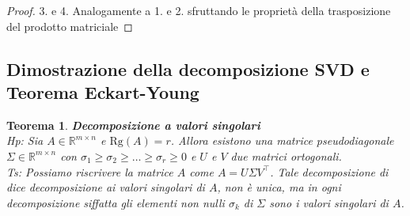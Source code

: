 \documentclass[11pt]{article}
\newtheorem{theorem}{Teorema}
\newcommand{\R}{\mathbb{R}} %
\begin{document}
\begin{proof}{3. e 4.}
Analogamente a 1. e 2. sfruttando le proprietà della trasposizione del prodotto matriciale
\end{proof}

\subsection{Dimostrazione della decomposizione SVD e Teorema Eckart-Young}
\begin{theorem}\label{svd}
\textbf{Decomposizione a valori singolari}\\
\textit{Hp:} Sia $A \in \R^{m \times n}$ e $\text{Rg}(A)=r$. Allora esistono una matrice pseudodiagonale $\Sigma \in \R^{m \times n}$ con $\sigma_1 \geq \sigma_2 \geq \dots \geq \sigma_r \geq 0$ e $U$ e $V$ due matrici ortogonali.\\
\textit{Ts:} Possiamo riscrivere la matrice $A$ come $A=U\Sigma V^\top$. Tale decomposizione di dice decomposizione ai valori singolari di $A$, non è unica, ma in ogni decomposizione siffatta gli elementi non nulli $\sigma_k$ di $\Sigma$ sono i valori singolari di $A$. 
\end{theorem}
\end{document}
